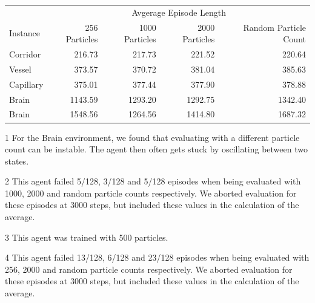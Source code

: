 \begin{table} [htp]
    \begin{center}
        \begin{threeparttable}
            \begin{tabular}{lrrrr}
                \toprule
                & \multicolumn{4}{c}{Avgerage Episode Length} \\
                \cmidrule(lr){2-5}
                Instance & 256 Particles & 1000 Particles & 2000 Particles & Random Particle Count  \\
                \midrule
                Corridor & 216.73 & 217.73 & 221.52 & 220.64  \\
                Vessel & 373.57 & 370.72 & 381.04 & 385.63 \\
                Capillary & 375.01 & 377.44 & 377.90 & 378.88 \\
                Brain\tnote{1} & 1143.59 & 1293.20\tnote{2} & 1292.75\tnote{2} & 1342.40\tnote{2} \\
                \midrule
                Brain\tnote{3} & 1548.56\tnote{4} & 1264.56 & 1414.80\tnote{4} & 1687.32\tnote{4} \\
                \bottomrule
            \end{tabular}
            \begin{tablenotes}
                \footnotesize
                \item [1] For the Brain environment, we found that evaluating with a different particle count can be instable. The agent then often gets stuck by oscillating between two states.
                \item[2] This agent failed 5/128, 3/128 and 5/128 episodes when being evaluated with 1000, 2000 and random particle counts respectively. We aborted evaluation for these episodes at 3000 steps, but included these values in the calculation of the average.
                \item[3] This agent was trained with 500 particles.
                \item[4] This agent failed 13/128, 6/128 and 23/128 episodes when being evaluated with 256, 2000 and random particle counts respectively. We aborted evaluation for these episodes at 3000 steps, but included these values in the calculation of the average.
            \end{tablenotes}

        \end{threeparttable}


\end{center}
\end{table}
